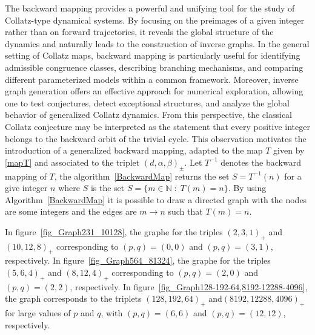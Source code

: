\documentclass[11pt,a4paper]{article}
\begin{document}
The backward mapping provides a powerful and unifying tool for the study of Collatz-type dynamical systems. By focusing on the preimages of a given integer rather than on forward trajectories, it reveals the global structure of the dynamics and naturally leads to the construction of inverse graphs. In the general setting of Collatz maps, backward mapping is particularly useful for identifying admissible congruence classes, describing branching mechanisms, and comparing different parameterized models within a common framework. Moreover, inverse graph generation offers an effective approach for numerical exploration, allowing one to test conjectures, detect exceptional structures, and analyze the global behavior of generalized Collatz dynamics. From this perspective, the classical Collatz conjecture may be interpreted as the statement that every positive integer belongs to the backward orbit of the trivial cycle. This observation motivates the introduction of a generalized backward mapping, adapted to the map $T$ given by \eqref{mapT} and 
associated to the triplet $(d,\alpha,\beta)_{\pmb{\pm}}$.
Let $T^{-1}$ denotes the backward mapping of $T$, the  algorithm~\ref{BackwardMap} returns  the set $S=T^{-1}(n)$ for a give integer $n$ where $S$ is the set $S=\{m\in\mathbb{N}\;:\; T(m)=n\}$. By using  Algorithm~\ref{BackwardMap} it is possible to draw a directed graph  with the nodes are some integers and the  edges are $m\rightarrow n$ such that $T(m)=n$.



In figure~\ref{fig_Graph231_10128}, the graphe for  the triples $(2,3,1)_+$ and  $(10,12,8)_+$ corresponding to $(p,q)=(0,0)$ and $(p,q)=(3,1)$, respectively. In figure~\ref{fig_Graph564_81324}, the graphe for  the triples $(5,6,4)_+$ and  $(8,12,4)_+$ corresponding to $(p,q)=(2,0)$ and $(p,q)=(2,2)$, respectively.  In figure~\ref{fig_Graph128-192-64,8192-12288-4096}, the graph corresponds to the triplets
$(128,192,64)_+$  and$(8192,12288,4096)_+$ for large values of $p$ and $q$, with $(p,q)=(6,6)$ and 
$(p,q)=(12,12)$, respectively.
\end{document}
